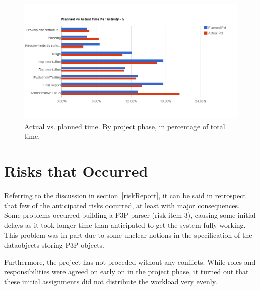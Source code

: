 \begin{centering}
  \begin{figure}[h!]
    \includegraphics[width=\textwidth]{Evaluation/time_per_activity_pct}
    \caption{Actual vs. planned time. By project phase, in percentage of total time.}
    \label{perActivityCUml}
  \end{figure}
\end{centering}

\section{Risks that Occurred}\label{courseEval}

Referring to the discussion in section~\ref{riskReport}, it can be said
in retrospect that few of the anticipated risks occurred, at least
with major consequences. Some problems occurred building a P3P
parser (risk item 3), causing some initial delays as it took longer time than
anticipated to get the system fully working. This problem was in part
due to some unclear notions in the specification of the dataobjects
storing P3P objects.

Furthermore, the project has not proceded without any conflicts. While
roles and responsibilities were agreed on early on in the project
phase, it turned out that these initial assignments did not distribute the
workload very evenly. 
